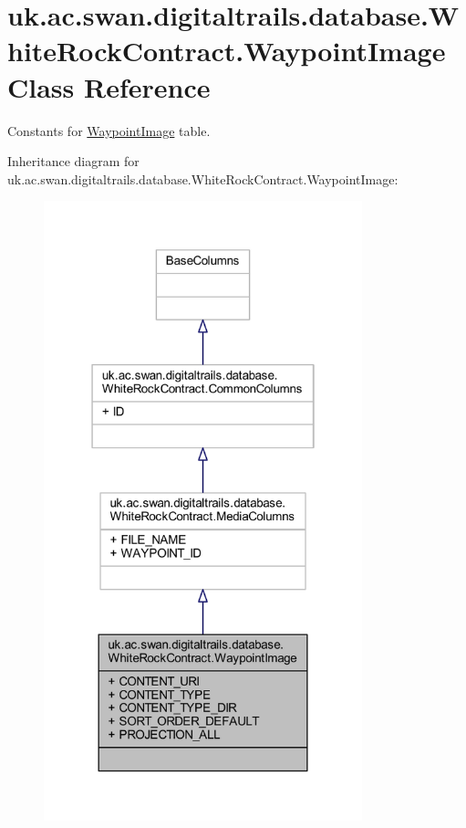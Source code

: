 \hypertarget{classuk_1_1ac_1_1swan_1_1digitaltrails_1_1database_1_1_white_rock_contract_1_1_waypoint_image}{\section{uk.\+ac.\+swan.\+digitaltrails.\+database.\+White\+Rock\+Contract.\+Waypoint\+Image Class Reference}
\label{classuk_1_1ac_1_1swan_1_1digitaltrails_1_1database_1_1_white_rock_contract_1_1_waypoint_image}
}


Constants for \hyperlink{classuk_1_1ac_1_1swan_1_1digitaltrails_1_1database_1_1_white_rock_contract_1_1_waypoint_image}{Waypoint\+Image} table.  




Inheritance diagram for uk.\+ac.\+swan.\+digitaltrails.\+database.\+White\+Rock\+Contract.\+Waypoint\+Image\+:
\nopagebreak
\begin{figure}[H]
\begin{center}
\leavevmode
\includegraphics[width=262pt]{classuk_1_1ac_1_1swan_1_1digitaltrails_1_1database_1_1_white_rock_contract_1_1_waypoint_image__inherit__graph}
\end{center}
\end{figure}



